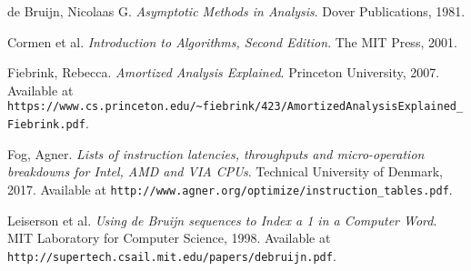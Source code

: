 \begin{flushleft}
\begin{thebibliography}{9}

	de Bruijn, Nicolaas G. \textit{Asymptotic Methods in Analysis}. Dover Publications, 1981.

	Cormen et al. \textit{Introduction to Algorithms, Second Edition}. The MIT Press, 2001.

	Fiebrink, Rebecca. \textit{Amortized Analysis Explained}. Princeton University, 2007. Available at \texttt{https://www.cs.princeton.edu/\textasciitilde{}fiebrink/423/AmortizedAnalysisExplained\_Fiebrink.pdf}.

	Fog, Agner. \textit{Lists of instruction latencies, throughputs and micro-operation breakdowns for Intel, AMD and VIA CPUs}. Technical University of Denmark, 2017. Available at \texttt{http://www.agner.org/optimize/instruction\_tables.pdf}.

	Leiserson et al. \textit{Using de Bruijn sequences to Index a 1 in a Computer Word}. MIT Laboratory for Computer Science, 1998. Available at \texttt{http://supertech.csail.mit.edu/papers/debruijn.pdf}.

\end{thebibliography}
\end{flushleft}